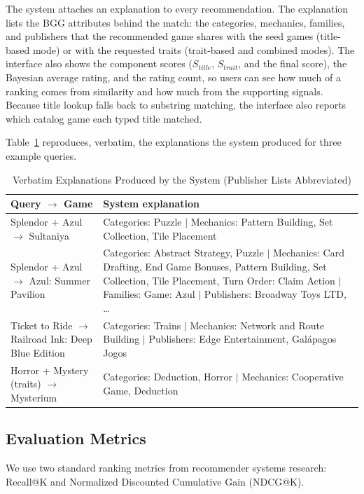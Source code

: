 \documentclass[conference]{IEEEtran}
\begin{document}
The system attaches an explanation to every recommendation. The explanation lists the BGG attributes behind the match: the categories, mechanics, families, and publishers that the recommended game shares with the seed games (title-based mode) or with the requested traits (trait-based and combined modes). The interface also shows the component scores ($S_{title}$, $S_{trait}$, and the final score), the Bayesian average rating, and the rating count, so users can see how much of a ranking comes from similarity and how much from the supporting signals. Because title lookup falls back to substring matching, the interface also reports which catalog game each typed title matched.

Table~\ref{tab:explain} reproduces, verbatim, the explanations the system produced for three example queries.

\begin{table}[h]
\centering
\caption{Verbatim Explanations Produced by the System (Publisher Lists Abbreviated)}
\label{tab:explain}
\begin{tabular}{|p{2.0cm}|p{5.6cm}|}
\hline
Query $\rightarrow$ Game & System explanation \\
\hline
Splendor + Azul $\rightarrow$ Sultaniya & Categories: Puzzle $|$ Mechanics: Pattern Building, Set Collection, Tile Placement \\
\hline
Splendor + Azul $\rightarrow$ Azul: Summer Pavilion & Categories: Abstract Strategy, Puzzle $|$ Mechanics: Card Drafting, End Game Bonuses, Pattern Building, Set Collection, Tile Placement, Turn Order: Claim Action $|$ Families: Game: Azul $|$ Publishers: Broadway Toys LTD, \ldots \\
\hline
Ticket to Ride $\rightarrow$ Railroad Ink: Deep Blue Edition & Categories: Trains $|$ Mechanics: Network and Route Building $|$ Publishers: Edge Entertainment, Gal\'apagos Jogos \\
\hline
Horror + Mystery (traits) $\rightarrow$ Mysterium & Categories: Deduction, Horror $|$ Mechanics: Cooperative Game, Deduction \\
\hline
\end{tabular}
\end{table}

\subsection{Evaluation Metrics}

We use two standard ranking metrics from recommender systems research: Recall@K and Normalized Discounted Cumulative Gain (NDCG@K).
\end{document}
